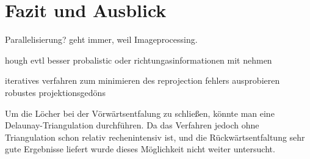 \chapter{Fazit und Ausblick}
Parallelisierung?
geht immer, weil Imageprocessing.

hough evtl besser probalistic oder richtungasinformationen mit nehmen



iteratives verfahren zum minimieren des reprojection fehlers ausprobieren
robustes projektionsgedöns

Um die Löcher bei der Vörwärtsentfalung zu schließen, könnte man eine Delaunay-Triangulation durchführen. 
Da das Verfahren jedoch ohne Triangulation schon relativ rechenintensiv ist, und die Rückwärtsentfaltung sehr gute Ergebnisse liefert wurde dieses Möglichkeit nicht weiter untersucht.
